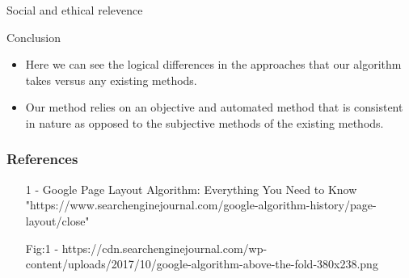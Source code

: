 \documentclass[11pt]{beamer}
\begin{document}
	\begin{frame}{Social and ethical relevence}
		\begin{itemsize}
			\item
		\end{itemsize}
\end{frame}

	\begin{frame}{Conclusion}
		\begin{itemize}
			\item Here we can see the logical differences in the approaches that our algorithm takes versus any existing methods.
			\item Our method relies on an objective and automated method that is consistent in nature as opposed to the subjective methods of the existing methods.
		\end{itemize}
	\end{frame}
	\begin{frame}
		\frametitle{\LARGE \textbf{References}}
		\begin{itemize}
			\item [1] - Google Page Layout Algorithm: Everything You Need to Know 
			"https://www.searchenginejournal.com/google-algorithm-history/page-layout/close"
			\item [Fig:1] - https://cdn.searchenginejournal.com/wp-content/uploads/2017/10/google-algorithm-above-the-fold-380x238.png
		\end{itemize}
	\end{frame}
\end{document}
